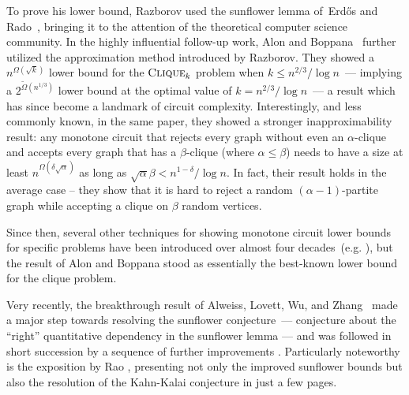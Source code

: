 \documentclass[10pt,a4paper]{article}
\newcommand{\Erdos}{Erdős }
\newcommand{\cliquep}{\textsc{Clique}}
\begin{document}
To prove his lower bound, Razborov used the sunflower lemma of~\Erdos and Rado~\cite{erdos60}, bringing it to the attention of the theoretical computer science community. In the highly influential follow-up work, Alon and Boppana~\cite{alon87} further utilized the approximation method introduced by Razborov. They showed a $n^{\Omega(\sqrt{k})}$ lower bound for the $\cliquep_k$ problem when $k \leq n^{2/3}/\log n$~--- implying a $2^{\tilde{\Omega}(n^{1/3})}$ lower bound at the optimal value of $k=n^{2/3} / \log n$~--- a result which has since become a landmark of circuit complexity. Interestingly, and less commonly known, in the same paper, they showed a stronger inapproximability result: any monotone circuit that rejects every graph without even an $\alpha$-clique and accepts every graph that has a $\beta$-clique (where $\alpha \leq \beta$) needs to have a size at least $n^{\Omega(\delta \sqrt{\alpha})}$ as long as $\sqrt{\alpha} \beta < n^{1-\delta}/\log n$. In fact, their result holds in the average case -- they show that it is hard to reject a random $(\alpha-1)$-partite graph while accepting a clique on $\beta$ random vertices.

Since then, several other techniques for showing monotone circuit lower bounds for specific problems have been introduced over almost four decades~(e.g. \cite{andreev1985method,andreev1987method,jukna1999combinatorics,garg2018monotone,goos2019adventures,cavalar2023}), but the result of Alon and Boppana stood as essentially the best-known lower bound for the clique problem.

Very recently, the breakthrough result of Alweiss, Lovett, Wu, and Zhang~\cite{alweiss20} made a major step towards resolving the sunflower conjecture~--- conjecture about the ``right'' quantitative dependency in the sunflower lemma --- and was followed in short succession by a sequence of further improvements \cite{bell2021note,Rao2020Coding,Tao2020sunflower, Hu2021sunflower, rao2023sunflowers}. Particularly noteworthy is the exposition by Rao \cite{rao2023sunflowers}, presenting not only the improved sunflower bounds but also the resolution of the Kahn-Kalai conjecture in just a few pages.
\end{document}
